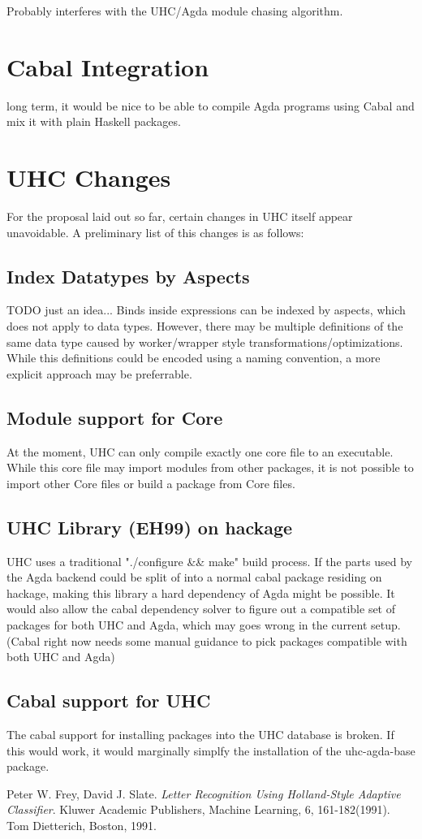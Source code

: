 \documentclass[12pt, a4paper, twoside]{report}
\begin{document}
Probably interferes with the UHC/Agda module chasing algorithm.

\section{Cabal Integration}
long term, it would be nice to be able to compile Agda programs using Cabal and
mix it with plain Haskell packages.

\section{UHC Changes}
For the proposal laid out so far, certain changes in UHC itself appear
unavoidable. A preliminary list of this changes is as follows:

\subsection{Index Datatypes by Aspects}
TODO just an idea...
Binds inside expressions can be indexed by aspects, which does
not apply to data types. However, there may be multiple definitions
of the same data type caused by worker/wrapper style transformations/optimizations.
While this definitions could be encoded using a naming convention, a more explicit
approach may be preferrable.

\subsection{Module support for Core}
At the moment, UHC can only compile exactly one core file to an executable.
While this core file may import modules from other packages, it is not possible
to import other Core files or build a package from Core files.

\subsection{UHC Library (EH99) on hackage}
UHC uses a traditional "./configure \&\& make" build process. If the parts used by the
Agda backend could be split of into a normal cabal package residing on hackage,
making this library a hard dependency of Agda might be possible.
It would also allow the cabal dependency solver to figure out a compatible
set of packages for both UHC and Agda, which may goes wrong in the current setup.
(Cabal right now needs some manual guidance to pick packages compatible with both UHC and Agda)

\subsection{Cabal support for UHC}
The cabal support for installing packages into the UHC database is broken. If this would work, it
would marginally simplfy the installation of the uhc-agda-base package.

\begin{thebibliography}{1}

  Peter W. Frey, David J. Slate.
  \emph{Letter Recognition Using Holland-Style Adaptive Classifier}.
  Kluwer Academic Publishers,
  Machine Learning, 6, 161-182(1991).
  Tom Dietterich, Boston,
  1991.

\end{thebibliography}
\end{document}
